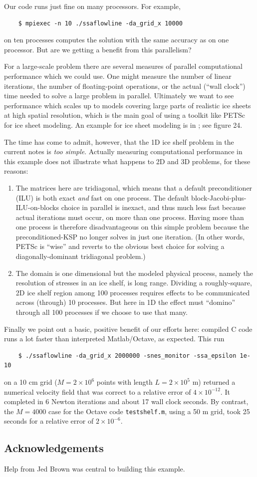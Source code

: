 \documentclass[11pt,final,reqno]{amsart}
\begin{document}
Our code runs just fine on many processors.  For example,
\begin{Verbatim}
    $ mpiexec -n 10 ./ssaflowline -da_grid_x 10000
\end{Verbatim}
on ten processes computes the solution with the same accuracy as on one processor.  But are we getting a benefit from this parallelism?

For a large-scale problem there are several measures of parallel computational performance which we could use.  One might measure the number of linear iterations, the number of floating-point operations, or the actual (``wall clock'') time needed to solve a large problem in parallel.  Ultimately we want to see performance which scales up to models covering large parts of realistic ice sheets at high spatial resolution, which is the main goal of using a toolkit like PETSc for ice sheet modeling.  An example for ice sheet modeling is in \cite{BBssasliding}; see figure 24.

The time has come to admit, however, that the 1D ice shelf problem in the current notes is \emph{too simple}.  Actually measuring computational performance in this example does not illustrate what happens to 2D and 3D problems, for these reasons:\begin{enumerate}
\item The matrices here are tridiagonal, which means that a default preconditioner (ILU) is both exact \emph{and} fast on one process.  The default block-Jacobi-plus-ILU-on-blocks choice in parallel is inexact, and thus much less fast because actual iterations must occur, on more than one process.  Having more than one process is therefore disadvantageous on this simple problem because the preconditioned-KSP no longer solves in just one iteration.  (In other words, PETSc is ``wise'' and reverts to the obvious best choice for solving a diagonally-dominant tridiagonal problem.)
\item The domain is one dimensional but the modeled physical process, namely the resolution of stresses in an ice shelf, is long range.  Dividing a roughly-square, 2D ice shelf region among 100 processes requires effects to be communicated across (through) 10 processes.  But here in 1D the effect must ``domino'' through all 100 processes if we choose to use that many.
\end{enumerate}

Finally we point out a basic, positive benefit of our efforts here: compiled C code runs a lot faster than interpreted Matlab/Octave, as expected.  This run
\begin{Verbatim}
    $ ./ssaflowline -da_grid_x 2000000 -snes_monitor -ssa_epsilon 1e-10
\end{Verbatim}
on a 10 cm grid ($M=2\times 10^6$ points with length $L=2 \times 10^5$ m) returned a numerical velocity field that was correct to a relative error of $4\times 10^{-12}$.  It completed in 6 Newton iterations and about 17 wall clock seconds.  By contrast, the $M=4000$ case for the Octave code \texttt{testshelf.m}, using a 50 m grid, took 25 seconds for a relative error of $2 \times 10^{-6}$.

\subsection*{Acknowledgements}  Help from Jed Brown was central to building this example.



\end{document}
